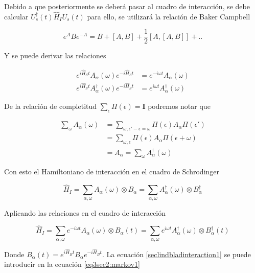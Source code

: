 Debido a que posteriormente se deberá pasar al cuadro de interacción, se debe calcular $U^{\dagger}_{s}(t)\hat{H}_{I}U_{s}(t)$ para ello, se utilizará la relación de Baker Campbell

\begin{equation}
    e^{A}Be^{-A} = B  + [A,B] + \frac{1}{2}[A,[A,B]] +..
    \label{sec2lind:baker}
\end{equation}

Y se puede derivar las relaciones 

\begin{align*}
    e^{i\hat{H}_{S}t}A_{\alpha}(\omega) e^{-i\hat{H}_{S}t} & = e^{-i\omega t} A_{\alpha}(\omega) \\
    e^{i\hat{H}_{S}t}A^{\dagger}_{\alpha}(\omega) e^{-i\hat{H}_{S}t} & = e^{i\omega t} A^{\dagger}_{\alpha}(\omega)
\end{align*}

De la relación de completitud $\sum_{\epsilon}\Pi(\epsilon) = \mathbf{I}$ podremos notar que

\begin{align*}
   \sum_{\omega}A_{\alpha}(\omega) & =  \sum_{\omega,\epsilon'-\epsilon  = \omega} \Pi(\epsilon) A_{\alpha} \Pi(\epsilon') \\
   & = \sum_{\omega,\epsilon} \Pi(\epsilon) A_{\alpha} \Pi(\epsilon + \omega) \\
   & = A_{\alpha} = \sum_{\omega}A^{\dagger}_{\alpha}(\omega)
\end{align*}

Con esto el Hamiltoniano de interacción en el cuadro de Schrodinger

\begin{equation*}
    \hat{H}_{I} = \sum_{\alpha,\omega}A_{\alpha}(\omega) \otimes B_{\alpha} = \sum_{\alpha,\omega}A^{\dagger}_{\alpha}(\omega) \otimes B^{\dagger}_{\alpha}
\end{equation*}

Aplicando las relaciones en el cuadro de interacción

\begin{equation}
    \hat{H}_{I} = \sum_{\alpha,\omega}e^{-i\omega t}A_{\alpha}(\omega) \otimes B_{\alpha}(t) = \sum_{\alpha,\omega}e^{i\omega t}A^{\dagger}_{\alpha}(\omega) \otimes B^{\dagger}_{\alpha}(t)
    \label{seclindbladinteraction1}
\end{equation}

Donde $B_{\alpha}(t) = e^{i\hat{H}_{B}t}B_{\alpha}e^{-i\hat{H}_{B}t}$. La ecuación \ref{seclindbladinteraction1} se puede introducir en la ecuación \ref{eq3sec2:markov1}

